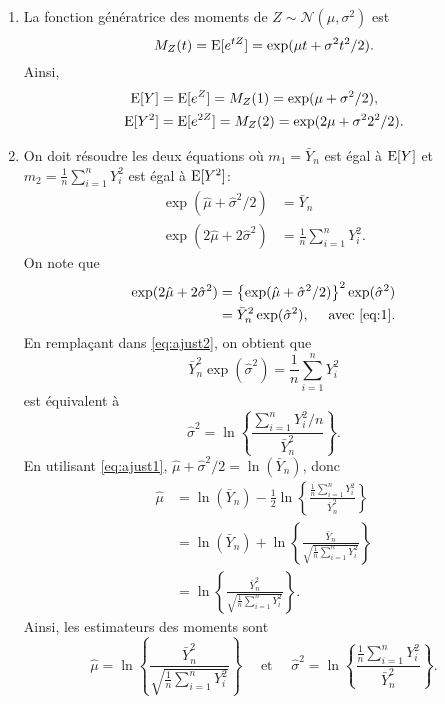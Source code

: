 \begin{solution}{4.2}
\begin{enumerate}
\item La fonction génératrice des moments de $Z\sim\mathcal{N}(\mu,\sigma^2)$ est
$$
M_{Z}(t)=\operatorname{E}[e^{tZ}]=\exp(\mu t +\sigma^2 t^2/2).
$$
Ainsi,
\begin{align*}
\operatorname{E}[Y]&= \operatorname{E}[e^{Z}]=M_Z(1)=\exp(\mu +\sigma^2/2),\\
\operatorname{E}[Y^2]&= \operatorname{E}[e^{2Z}]=M_Z(2)=\exp(2\mu +\sigma^2 2^2/2).
\end{align*}

\item On doit résoudre les deux équations où $m_1=\bar Y_n$ est égal à $\operatorname{E}[Y]$ et $m_2=\frac{1}{n}\sum_{i=1}^n Y_i^2$ est égal à $\operatorname{E}[Y^2]$:
\begin{align}
\exp(\hat\mu +\hat\sigma^2/2)&=\bar Y_n \label{eq:ajust1}\\
\exp(2\hat\mu +2\hat\sigma^2 )&=\frac{1}{n}\sum_{i=1}^n Y_i^2.\label{eq:ajust2}
\end{align}
On note que
 \begin{align*}
 \exp(2\hat\mu +2\hat\sigma^2 )&=\left\{\exp(\hat\mu +\hat\sigma^2/2)\right\}^2\exp(\hat\sigma^2)\\
 &=\bar Y_n^2 \exp(\hat\sigma^2),\quad \mbox{ avec \eqref{eq:1}}.
 \end{align*}
 En remplaçant dans \eqref{eq:ajust2}, on obtient que
 $$
 \bar{Y}_n^2 \exp(\hat\sigma^2) = \frac{1}{n}\sum_{i=1}^n Y_i^2
 $$
 est équivalent à
 $$
 \hat\sigma^2 = \ln\left\{\frac{\sum_{i=1}^n Y_i^2/n}{\bar{Y}_n^2} \right\}.
 $$
 En utilisant \eqref{eq:ajust1}, $\hat\mu +\hat\sigma^2/2=\ln(\bar Y_n )$, donc
\begin{align*}
\hat\mu & = \ln(\bar Y_n )-\frac{1}{2}\ln\left\{\frac{\frac{1}{n}\sum_{i=1}^n Y_i^2}{\bar Y_n^2} \right\}\\
& = \ln(\bar Y_n )+\ln\left\{\frac{\bar Y_n}{\sqrt{\frac{1}{n}\sum_{i=1}^n Y_i^2}} \right\}\\
& = \ln\left\{\frac{\bar Y_n^2}{\sqrt{\frac{1}{n}\sum_{i=1}^n Y_i^2}} \right\}.
\end{align*}
Ainsi, les estimateurs des moments sont
$$
\hat \mu = \ln\left\{\frac{\bar Y_n^2}{\sqrt{\frac{1}{n}\sum_{i=1}^n Y_i^2}} \right\} \quad \mbox{ et }\quad \hat\sigma^2 = \ln\left\{\frac{\frac{1}{n}\sum_{i=1}^n Y_i^2}{\bar Y_n^2} \right\}.
$$


\end{enumerate}
\end{solution}

